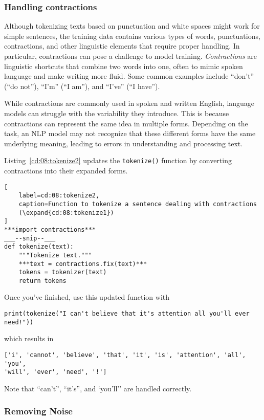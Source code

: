 \subsubsection{Handling contractions}

Although tokenizing texts based on punctuation and white spaces might work for simple sentences, the training data contains various types of words, punctuations, contractions, and other linguistic elements that require proper handling. In particular, contractions can pose a challenge to model training.
\emph{Contractions} are linguistic shortcuts that combine two words into one, often to mimic spoken language and make writing more fluid. Some common examples include ``don't'' (``do not''), ``I'm'' (``I am''), and ``I've'' (``I have'').

While contractions are commonly used in spoken and written English, language models can struggle with the variability they introduce. This is because contractions can represent the same idea in multiple forms.
Depending on the task, an NLP model may not recognize that these different forms have the same underlying meaning, leading to errors in understanding and processing text.

Listing~\ref{cd:08:tokenize2} updates the \lstinline{tokenize()} function by converting contractions into their expanded forms.
\begin{lstlisting}[
    label=cd:08:tokenize2,
    caption=Function to tokenize a sentence dealing with contractions
    (\expand{cd:08:tokenize1})
]
***import contractions***
___--snip--___
def tokenize(text):
    """Tokenize text."""
    ***text = contractions.fix(text)***
    tokens = tokenizer(text)
    return tokens
\end{lstlisting}
Once you've finished, use this updated function with
\begin{lstlisting}
print(tokenize("I can't believe that it's attention all you'll ever need!"))
\end{lstlisting}
which results in
\begin{lstlisting}
['i', 'cannot', 'believe', 'that', 'it', 'is', 'attention', 'all', 'you', 
'will', 'ever', 'need', '!']
\end{lstlisting}
Note that ``can't'', ``it's'', and `you'll'' are handled correctly.


\subsubsection{Removing Noise}

